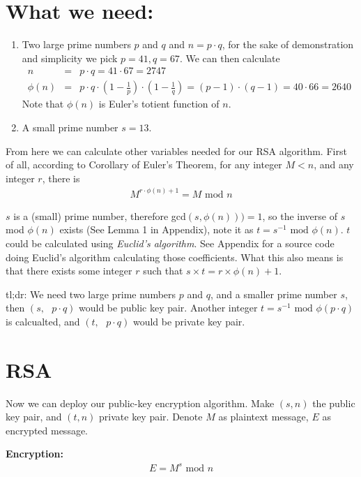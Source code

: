 \documentclass[]{paper}
\begin{document}
\section*{\large What we need:}
\begin{enumerate}
    \item Two large prime numbers $p$ and $q$ and $n = p\cdot q$, for the sake of demonstration and simplicity we pick $p = 41, q = 67$. We can then calculate
\begin{eqnarray*}
n &=& p \cdot q = 41 \cdot 67 = 2747 \\
\phi(n) &=& p\cdot q \cdot (1- \frac{1}{p})\cdot (1-\frac{1}{q})= (p-1)\cdot(q-1) = 40 \cdot 66 = 2640
\end{eqnarray*}
Note that $\phi(n)$ is Euler's totient function of $n$.
    \item A small prime number $s=13$.
\end{enumerate}


From here we can calculate other variables needed for our RSA algorithm. First of all, according to Corollary of Euler's Theorem, for any integer $M < n$, and any integer $r$, there is
\begin{align*}
    M^{r\cdot\phi(n) + 1} = M \text{ mod } n
\end{align*}

$s$ is a (small) prime number, therefore gcd$(s, \phi(n)))=1$, so the inverse of $s$ mod $\phi(n)$ exists (See Lemma 1 in Appendix), note it as $t = s^{-1}\text{ mod } \phi(n)$. $t$ could be calculated using \emph{Euclid's algorithm}. See Appendix for a source code doing Euclid's algorithm calculating those coefficients. What this also means is that there exists some integer $r$ such that $s\times t = r\times\phi(n)+1$.

tl;dr: We need two large prime numbers $p$ and $q$, and a smaller prime number $s$, then $(s,\text{ }p\cdot q)$ would be public key pair. Another integer $t = s^{-1}\text{ mod }\phi(p\cdot q)$ is calcualted, and $(t,\text{ }p\cdot q)$ would be private key pair.
\section*{RSA}
Now we can deploy our public-key encryption algorithm. Make $(s,n)$ the public key pair, and $(t,n)$ private key pair. Denote $M$ as plaintext message, $E$ as encrypted message.

\textbf{Encryption:}
\begin{eqnarray*}
E = M^s\text{ mod }n
\end{eqnarray*}
\end{document}
